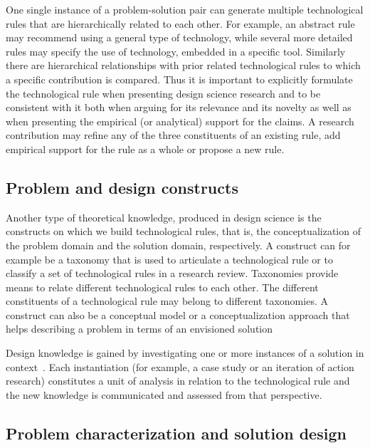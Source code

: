 \documentclass[graybox]{svmult}
\begin{document}
One single instance of a problem-solution pair can generate multiple technological rules that are hierarchically related to each other. For example, an abstract rule may recommend using a general type of technology, while several more detailed rules may specify the use of technology, embedded in a specific tool.  Similarly there are hierarchical relationships with prior related technological rules to which a specific contribution is compared.
Thus it is important to explicitly formulate the technological rule when presenting design science research and to be consistent with it both when arguing for its relevance and its novelty as well as when presenting the empirical (or analytical) support for the claims.  A research contribution may refine any of the three constituents of an existing rule, add empirical support for the rule as a whole or propose a new rule.



\subsection{Problem and design constructs}
\label{sec:constructs}
Another type of theoretical knowledge, produced in design science is the 
constructs on which we build technological rules, that is, the conceptualization of the problem domain and the solution domain, respectively.  
A construct can for example be a taxonomy that is used to articulate a technological rule or to classify a set of technological rules in a research review. Taxonomies provide means to relate different technological rules to each other. The different constituents of a technological rule may belong to different taxonomies. A construct can also be a conceptual model or a conceptualization approach that helps describing a problem in terms of an envisioned solution

Design knowledge is gained by investigating one or more instances of a solution in context~\cite{wieringa_what_2014}. Each instantiation (for example, a case study or an iteration of action research) constitutes a unit of analysis in relation to the technological rule and the new knowledge is communicated and assessed from that perspective. 

\subsection{Problem characterization and solution design}
\end{document}

